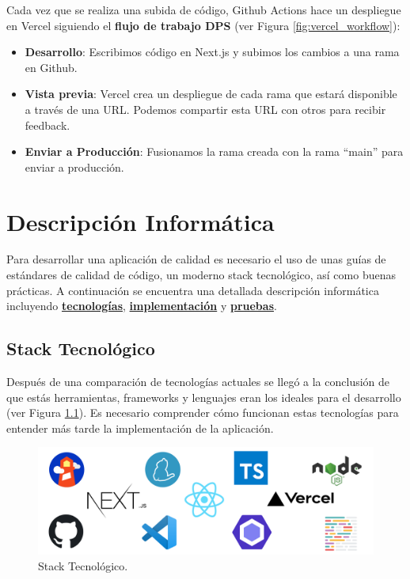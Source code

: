 \documentclass[12pt,twoside,titlepage]{report}
\begin{document}
Cada vez que se realiza una subida de código, Github Actions hace un despliegue en Vercel siguiendo el \textbf{flujo de trabajo DPS} \cite{dps} (ver Figura \ref{fig:vercel_workflow}):

\begin{itemize}
    \item \textbf{Desarrollo}: Escribimos código en Next.js y subimos los cambios a una rama en Github.
    \item \textbf{Vista previa}: Vercel crea un despliegue de cada rama que estará disponible a través de una URL. Podemos compartir esta URL con otros para recibir feedback. 
    \item \textbf{Enviar a Producción}: Fusionamos la rama creada con la rama ``main'' para enviar a producción.
\end{itemize}


\chapter{Descripción Informática}
\label{sec:desarrollo}

Para desarrollar una aplicación de calidad es necesario el uso de unas guías de estándares de calidad de código, un moderno stack tecnológico, así como buenas prácticas. A continuación se encuentra una detallada descripción informática incluyendo \hyperref[sec:stack]{\textbf{tecnologías}}, \hyperref[sec:implementacion]{\textbf{implementación}} y \hyperref[sec:pruebas]{\textbf{pruebas}}.

\section{Stack Tecnológico}
\label{sec:stack}

Después de una comparación de tecnologías actuales se llegó a la conclusión de que estás herramientas, frameworks y lenguajes eran los ideales para el desarrollo (ver Figura \ref{fig:logos}). Es necesario comprender cómo funcionan estas tecnologías para entender más tarde la implementación de la aplicación.

\begin{figure}[H]
    \centering
    \includegraphics[width=\textwidth]{Logos/Logos}
    \caption{Stack Tecnológico.}
    \label{fig:logos}
\end{figure}
\end{document}
